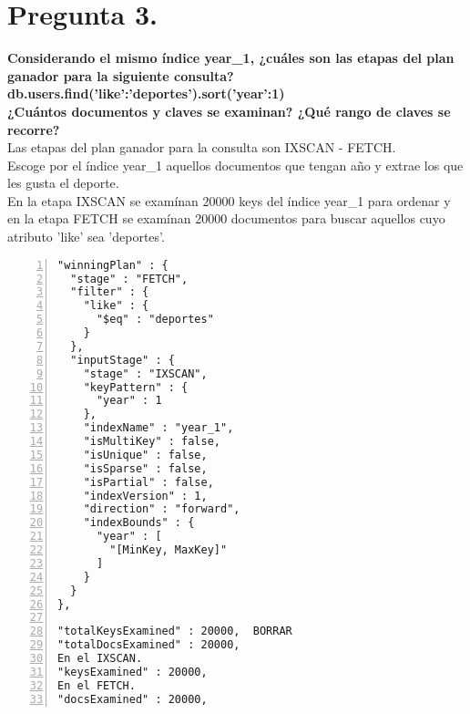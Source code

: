 \documentclass{article}
\begin{document}
  \section{Pregunta 3.}
  \textbf{Considerando el mismo índice year\_1, ¿cuáles son las etapas del plan ganador para la siguiente consulta? \\
  db.users.find({'like':'deportes'}).sort({'year':1}) \\
  ¿Cuántos documentos y claves se examinan? ¿Qué rango de claves se recorre? \\}
  Las etapas del plan ganador para la consulta son IXSCAN - FETCH. \\
  Escoge por el índice year\_1 aquellos documentos que tengan año y extrae los que les gusta el deporte. \\
  En la etapa IXSCAN se examínan 20000 keys del índice year\_1 para ordenar y en la etapa FETCH se examínan 20000 documentos para buscar
  aquellos cuyo atributo 'like' sea 'deportes'.
    \begin{lstlisting}[numbers=left,frame=single]
"winningPlan" : {
  "stage" : "FETCH",
  "filter" : {
    "like" : {
      "$eq" : "deportes"
    }
  },
  "inputStage" : {
    "stage" : "IXSCAN",
    "keyPattern" : {
      "year" : 1
    },
    "indexName" : "year_1",
    "isMultiKey" : false,
    "isUnique" : false,
    "isSparse" : false,
    "isPartial" : false,
    "indexVersion" : 1,
    "direction" : "forward",
    "indexBounds" : {
      "year" : [
        "[MinKey, MaxKey]"
      ]
    }
  }
},

"totalKeysExamined" : 20000,  BORRAR
"totalDocsExamined" : 20000,
En el IXSCAN.
"keysExamined" : 20000,
En el FETCH.
"docsExamined" : 20000,

    \end{lstlisting}


  \newpage
\end{document}
